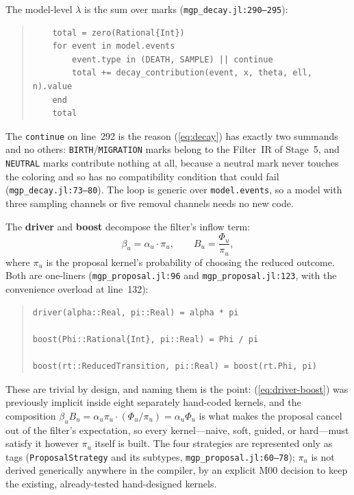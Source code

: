 \documentclass[11pt,leqno]{article}
\newcommand{\code}[1]{\texttt{#1}}
\theoremstyle{plain}
\theoremstyle{definition}
\begin{document}
The model-level $\lambda$ is the sum over marks
(\code{mgp\_decay.jl:290--295}):
\begin{quote}
{\small
\begin{verbatim}
    total = zero(Rational{Int})
    for event in model.events
        event.type in (DEATH, SAMPLE) || continue
        total += decay_contribution(event, x, theta, ell, n).value
    end
    total
\end{verbatim}
}
\end{quote}
The \code{continue} on line~292 is the reason (\ref{eq:decay}) has exactly two
summands and no others: \code{BIRTH}/\code{MIGRATION} marks belong to the
Filter~IR of Stage~5, and \code{NEUTRAL} marks contribute nothing at all,
because a neutral mark never touches the coloring and so has no compatibility
condition that could fail (\code{mgp\_decay.jl:73--80}).  The loop is
generic over \code{model.events}, so a model with three sampling channels or
five removal channels needs no new code.

The \textbf{driver} and \textbf{boost} decompose the filter's inflow
term:
\begin{equation}\label{eq:driver-boost}
  \beta_u = \alpha_u \cdot \pi_u, \qquad
  B_u = \frac{\Phi_u}{\pi_u},
\end{equation}
where $\pi_u$ is the proposal kernel's probability of choosing the
reduced outcome.  Both are one-liners (\code{mgp\_proposal.jl:96} and
\code{mgp\_proposal.jl:123}, with the convenience overload at line~132):
\begin{quote}
{\small
\begin{verbatim}
driver(alpha::Real, pi::Real) = alpha * pi

boost(Phi::Rational{Int}, pi::Real) = Phi / pi

boost(rt::ReducedTransition, pi::Real) = boost(rt.Phi, pi)
\end{verbatim}
}
\end{quote}
These are trivial by design, and naming them is the point:
(\ref{eq:driver-boost}) was previously implicit inside eight separately
hand-coded kernels, and the composition $\beta_u B_u = \alpha_u \pi_u \cdot
(\Phi_u/\pi_u) = \alpha_u \Phi_u$ is what makes the proposal cancel out of the
filter's expectation, so every kernel---naive, soft, guided, or hard---must
satisfy it however $\pi_u$ itself is built.  The four strategies are
represented only as tags (\code{ProposalStrategy} and its subtypes,
\code{mgp\_proposal.jl:60--78}); $\pi_u$ is not derived generically anywhere
in the compiler, by an explicit M00 decision to keep the existing,
already-tested hand-designed kernels.
\end{document}
